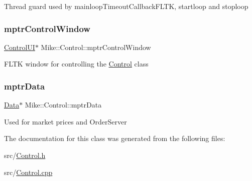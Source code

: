 \textquotesingle{}Thread guard\textquotesingle{} used by mainloop\+Timeout\+Callback\+F\+L\+TK, startloop and stoploop \mbox{\label{class_mike_1_1_control_ae6eb65158d5ab90cebb53cb46abf3d3c}} 
\subsubsection{\texorpdfstring{mptr\+Control\+Window}{mptrControlWindow}}
{\footnotesize\ttfamily \hyperlink{class_control_u_i}{Control\+UI}$\ast$ Mike\+::\+Control\+::mptr\+Control\+Window\hspace{0.3cm}{\ttfamily [private]}}

F\+L\+TK window for controlling the \hyperlink{class_mike_1_1_control}{Control} class \mbox{\label{class_mike_1_1_control_ad372b18cce9cd2fbd276df12bb4e886c}} 
\subsubsection{\texorpdfstring{mptr\+Data}{mptrData}}
{\footnotesize\ttfamily \hyperlink{class_mike_1_1_data}{Data}$\ast$ Mike\+::\+Control\+::mptr\+Data\hspace{0.3cm}{\ttfamily [private]}}

Used for market prices and Order\+Server 

The documentation for this class was generated from the following files\+:\begin{DoxyCompactItemize}
\item 
src/\hyperlink{_control_8h}{Control.\+h}\item 
src/\hyperlink{_control_8cpp}{Control.\+cpp}\end{DoxyCompactItemize}
